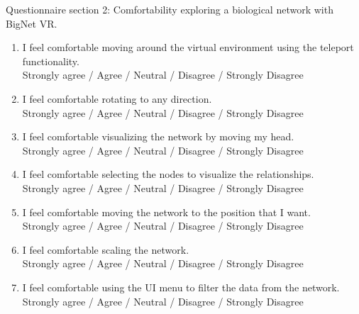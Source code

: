 Questionnaire section 2: Comfortability exploring a biological network with BigNet VR.
\begin{enumerate}
  \item I feel comfortable moving around the virtual environment using the teleport functionality.\\
  Strongly agree / Agree / Neutral / Disagree / Strongly Disagree

  \item I feel comfortable rotating to any direction.\\
  Strongly agree / Agree / Neutral / Disagree / Strongly Disagree

  \item I feel comfortable visualizing the network by moving my head.\\
  Strongly agree / Agree / Neutral / Disagree / Strongly Disagree

  \item I feel comfortable selecting the nodes to visualize the relationships.\\
  Strongly agree / Agree / Neutral / Disagree / Strongly Disagree

  \item I feel comfortable moving the network to the position that I want.\\
  Strongly agree / Agree / Neutral / Disagree / Strongly Disagree

  \item I feel comfortable scaling the network.\\
  Strongly agree / Agree / Neutral / Disagree / Strongly Disagree

  \item I feel comfortable using the UI menu to filter the data from the network.\\
  Strongly agree / Agree / Neutral / Disagree / Strongly Disagree\\
\end{enumerate}

